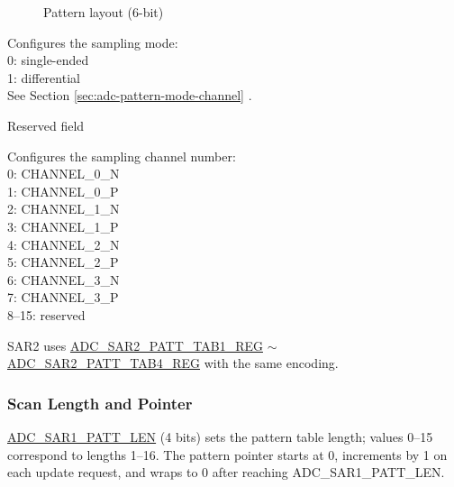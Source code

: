\documentclass[main\_\_EN.tex]{subfiles}
\begin{document}
\begin{figure}[H]
\centering
{}%
%
%
\end{figure}
\vspace{-2em}
\begin{figure}[H]
    \centering
    \caption{Pattern layout (6-bit)}
    \label{fig:adc-pattern-table-entry}
\end{figure}
\vspace{-2em}
\begin{regdesc}\begin{reglist}
\item [mode] Configures the sampling mode:\\
0: single-ended\\
1: differential\\
See Section \ref{sec:adc-pattern-mode-channel} \textit{}.

\item [reserved] Reserved field
\item [channel] Configures the sampling channel number:\\
0: CHANNEL\_0\_N \\
1: CHANNEL\_0\_P \\
2: CHANNEL\_1\_N\\
3: CHANNEL\_1\_P\\
4: CHANNEL\_2\_N\\
5: CHANNEL\_2\_P\\
6: CHANNEL\_3\_N\\
7: CHANNEL\_3\_P\\
8--15: reserved\\

\end{reglist}\end{regdesc}

SAR2 uses \hyperref[regdesc:ADCSAR2PATTTAB1REG]{ADC\_SAR2\_PATT\_TAB1\_REG} $\sim$ \hyperref[regdesc:ADCSAR2PATTTAB4REG]{ADC\_SAR2\_PATT\_TAB4\_REG} with the same encoding.

\subsubsection{Scan Length and Pointer}
\hyperref[fielddesc:ADCSAR1PATTLEN]{ADC\_SAR1\_PATT\_LEN} (4 bits) sets the pattern table length; values 0--15 correspond to lengths 1--16. The pattern pointer starts at 0, increments by 1 on each update request, and wraps to 0 after reaching ADC\_SAR1\_PATT\_LEN.
\end{document}
